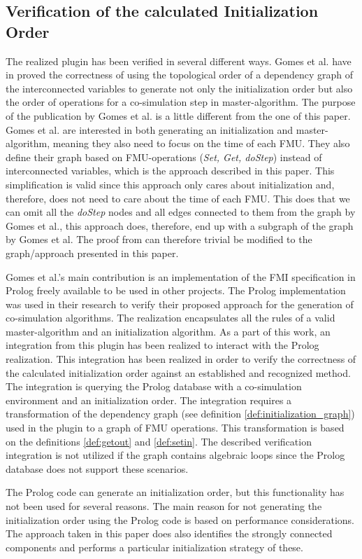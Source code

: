 \subsection{Verification of the calculated Initialization Order}
The realized plugin has been verified in several different ways. Gomes et al. have in \cite{gomes_lucio_vangheluwe_2019} proved the correctness of using the topological order of a dependency graph of the interconnected variables to generate not only the initialization order but also the order of operations for a co-simulation step in master-algorithm. The purpose of the publication by Gomes et al. is a little different from the one of this paper. Gomes et al. are interested in both generating an initialization and master-algorithm, meaning they also need to focus on the time of each FMU. They also define their graph based on FMU-operations (\textit{Set, Get, doStep}) instead of interconnected variables, which is the approach described in this paper. This simplification is valid since this approach only cares about initialization and, therefore, does not need to care about the time of each FMU. This does that we can omit all the \textit{doStep} nodes and all edges connected to them from the graph by Gomes et al., this approach does, therefore, end up with a subgraph of the graph by Gomes et al. The proof from \cite{gomes_lucio_vangheluwe_2019} can therefore trivial be modified to the graph/approach presented in this paper.

Gomes et al.'s main contribution is an implementation of the FMI specification in Prolog freely available to be used in other projects. The Prolog implementation was used in their research to verify their proposed approach for the generation of co-simulation algorithms. The realization encapsulates all the rules of a valid master-algorithm and an initialization algorithm. As a part of this work, an integration from this plugin has been realized to interact with the Prolog realization. This integration has been realized in order to verify the correctness of the calculated initialization order against an established and recognized method. The integration is querying the Prolog database with a co-simulation environment and an initialization order. The integration requires a transformation of the dependency graph (see definition \ref{def:initialization_graph}) used in the plugin to a graph of FMU operations. This transformation is based on the definitions \ref{def:getout} and \ref{def:setin}. The described verification integration is not utilized if the graph contains algebraic loops since the Prolog database does not support these scenarios.

The Prolog code can generate an initialization order, but this functionality has not been used for several reasons. The main reason for not generating the initialization order using the Prolog code is based on performance considerations. The approach taken in this paper does also identifies the strongly connected components and performs a particular initialization strategy of these.
